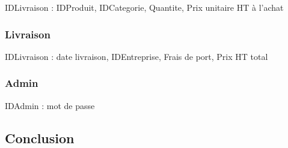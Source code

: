 \documentclass[a4paper, 12pt]{report}
\begin{document}
\begin{spacing}{1.2}
IDLivraison : IDProduit, IDCategorie, Quantite, Prix unitaire HT à l'achat

\textcolor{colortitre3}{\subsubsection*{\hypertarget{Livraison}{Livraison}}}

IDLivraison : date livraison, IDEntreprise, Frais de port, Prix HT total


\textcolor{colortitre3}{\subsubsection*{\hypertarget{Admin}{Admin}}}

IDAdmin : mot de passe

\newpage
\textcolor{colortitre1}{\section*{Conclusion}} 



\end{spacing}
\end{document}
